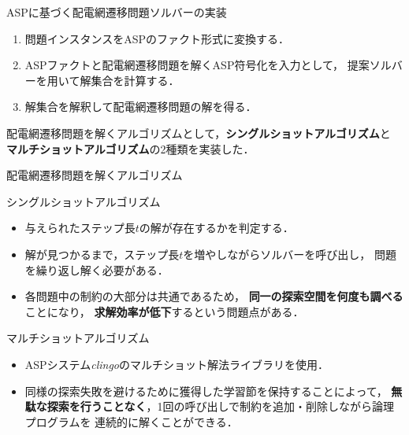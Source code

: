 \documentclass[dvipdfmx,11pt]{beamer}
\begin{document}
\begin{frame}{ASPに基づく配電網遷移問題ソルバーの実装}
 \centering
 \scalebox{0.6}{\hspace{-1zw}}
 \vfill
 \begin{enumerate}
  \item 問題インスタンスをASPのファクト形式に変換する．
  \item ASPファクトと配電網遷移問題を解くASP符号化を入力として，
        提案ソルバーを用いて解集合を計算する．
  \item 解集合を解釈して配電網遷移問題の解を得る．
 \end{enumerate}\vfill
 \begin{alertblock}{}
  配電網遷移問題を解くアルゴリズムとして，\textbf{シングルショットアルゴリズム}と
  \alert{\bf マルチショットアルゴリズム}の2種類を実装した．
 \end{alertblock}
\end{frame}
\begin{frame}{配電網遷移問題を解くアルゴリズム}
 \begin{block}{シングルショットアルゴリズム}
    \begin{itemize}
    \item 与えられたステップ長$t$の解が存在するかを判定する．
    \item 解が見つかるまで，ステップ長$t$を増やしながらソルバーを呼び出し，
          問題を繰り返し解く必要がある．
    \item 各問題中の制約の大部分は共通であるため，
      \textbf{同一の探索空間を何度も調べる}ことになり，
      \textbf{求解効率が低下}するという問題点がある．
  \end{itemize}
 \end{block}
 \vfill
 \begin{alertblock}{マルチショットアルゴリズム}
   \begin{itemize}
   \item ASPシステム\textit{clingo}のマルチショット解法ライブラリを使用．
   \item 同様の探索失敗を避けるために獲得した学習節を保持することによって，
		 \textbf{無駄な探索を行うことなく}，1回の呼び出しで制約を追加・削除しながら論理プログラムを
		 連続的に解くことができる．
  \end{itemize}
 \end{alertblock}
\end{frame}
\end{document}
